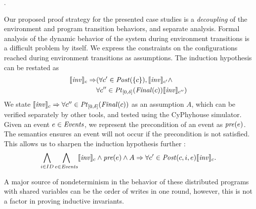 .

Our proposed proof strategy for the presented case studies is a \emph{decoupling} of the environment and program transition behaviors, and separate analysis. Formal analysis of the dynamic behavior of the system during environment transitions is a difficult problem by itself. We express the constraints on the configurations reached during environment transitions as assumptions. The induction hypothesis can be restated as \begin{align*}\llbracket\mathit{inv}\rrbracket_{c} \Rightarrow &(\forall c' \in \mathit{Post}(\left\{c\right\}), \llbracket\mathit{inv}\rrbracket_{c'} \wedge \\ &\forall c'' \in \mathit{Pt}_{[0,\delta]}(\mathit{Final}(c)) \llbracket\mathit{inv}\rrbracket_{c''})\end{align*} We state $\llbracket\mathit{inv}\rrbracket_{c} \Rightarrow \forall c'' \in \mathit{Pt}_{[0,\delta]}(\mathit{Final}(c)) $ as an assumption $A$, which can be verified separately by other tools, and tested using the CyPhyhouse simulator. Given an event $e\in \mathit{Events}$, we represent the precondition of an event as $\mathit{pre}(e)$. The semantics ensures an event will not occur if the precondition is not satisfied. This allows us to sharpen the induction hypothesis further :
    $$ \bigwedge_{i\in ID} \bigwedge_{e \in \mathit{Events}}  \llbracket\mathit{inv}\rrbracket_{c} \wedge \mathit{pre}(e) \wedge A \Rightarrow \forall c' \in  \mathit{Post}(c, i, e) \llbracket\mathit{inv}\rrbracket_{c}.$$



 A major source of nondeterminism in the behavior of these distributed programs with shared variables can be the order of writes in one round, however, this is not a factor in proving inductive invariants.



